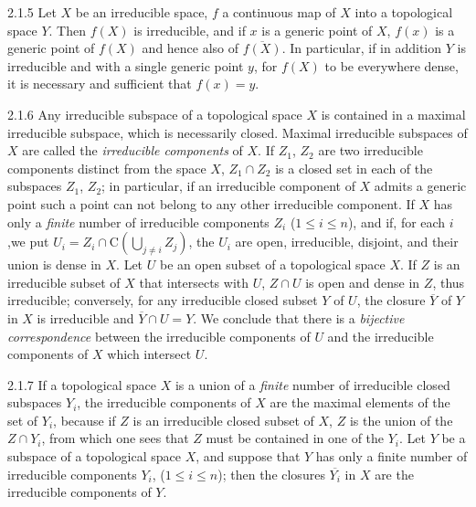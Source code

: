 \begin{env}{2.1.5}
\label{env-0.2.1.5}
Let $X$ be an irreducible space, $f$ a continuous map of $X$ into a topological space $Y$.
Then $f(X)$ is irreducible, and if $x$ is a generic point of $X$, $f(x)$ is a generic point
of $f(X)$ and hence also of $\overline{f(X)}$. In particular, if in addition $Y$ is
irreducible and with a single generic point $y$, for $f(X)$ to be everywhere dense, it is
necessary and sufficient that $f(x)=y$.
\end{env}

\begin{env}{2.1.6}
\label{env-0.2.1.6}
Any irreducible subspace of a topological space $X$ is contained in a maximal irreducible
subspace, which is necessarily closed. Maximal irreducible subspaces of $X$ are called the
\emph{irreducible components} of $X$. If $Z_1$, $Z_2$ are two irreducible components distinct
from the space $X$, $Z_1\cap Z_2$ is a closed  set in each of the
subspaces $Z_1$, $Z_2$; in particular, if an irreducible component of $X$ admits a generic
point  such a point can not belong to any other irreducible component. If
$X$ has only a \emph{finite} number of irreducible components $Z_i$
($1\leqslant i\leqslant n$), and if, for each $i$,we put
$U_i=Z_i\cap\mathrm{C}(\bigcup_{j\neq i}Z_j)$, the $U_i$ are open, irreducible, disjoint,
and their union is dense in $X$. Let $U$ be an open subset of a topological space $X$. If $Z$
is an irreducible subset of $X$ that intersects with $U$, $Z\cap U$ is open and dense in $Z$,
thus irreducible; conversely, for any irreducible closed subset $Y$ of $U$, the closure
$\overline{Y}$ of $Y$ in $X$ is irreducible and $\overline{Y}\cap U=Y$. We conclude that
there is a \emph{bijective correspondence} between the irreducible components of $U$ and the
irreducible components of $X$ which intersect $U$.
\end{env}

\begin{env}{2.1.7}
\label{env-0.2.1.7}
If a topological space $X$ is a union of a \emph{finite} number of irreducible closed
subspaces $Y_i$, the irreducible components of $X$ are the maximal elements of the set of
$Y_i$, because if $Z$ is an irreducible closed subset of $X$, $Z$ is the union of the
$Z\cap Y_i$, from which one sees that $Z$ must be contained in one of the $Y_i$. Let $Y$ be a
subspace of a topological space $X$, and suppose that $Y$ has only a finite number of
irreducible components $Y_i$, ($1\leqslant i\leqslant n$); then the closures $\overline{Y_i}$
in $X$ are the irreducible components of $Y$.
\end{env}

